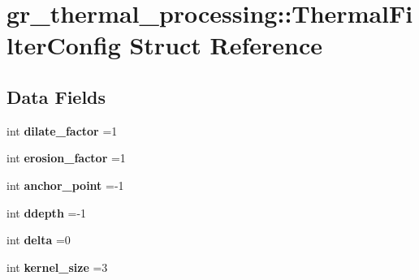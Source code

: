 \hypertarget{structgr__thermal__processing_1_1ThermalFilterConfig}{}\section{gr\+\_\+thermal\+\_\+processing\+:\+:Thermal\+Filter\+Config Struct Reference}
\label{structgr__thermal__processing_1_1ThermalFilterConfig}
\subsection*{Data Fields}
\begin{DoxyCompactItemize}
\item 
\mbox{\label{structgr__thermal__processing_1_1ThermalFilterConfig_acef89b6387318210f3413eb8b50fd862}} 
int {\bfseries dilate\+\_\+factor} =1
\item 
\mbox{\label{structgr__thermal__processing_1_1ThermalFilterConfig_aace1b2e21fad28bdfd6c4472dbae07de}} 
int {\bfseries erosion\+\_\+factor} =1
\item 
\mbox{\label{structgr__thermal__processing_1_1ThermalFilterConfig_af72c8201ea1b5498e6774e18b26acfd8}} 
int {\bfseries anchor\+\_\+point} =-\/1
\item 
\mbox{\label{structgr__thermal__processing_1_1ThermalFilterConfig_af84a31f8feba945eee13d9fc32813f65}} 
int {\bfseries ddepth} =-\/1
\item 
\mbox{\label{structgr__thermal__processing_1_1ThermalFilterConfig_a50bfc232e476c12cce1dff2c58d09088}} 
int {\bfseries delta} =0
\item 
\mbox{\label{structgr__thermal__processing_1_1ThermalFilterConfig_a86e89a77df3d1de431d04f1780dec743}} 
int {\bfseries kernel\+\_\+size} =3
\item 
\mbox{\label{structgr__thermal__processing_1_1ThermalFilterConfig_a55671cc53cf046e51413237a05b58523}} 

\end{DoxyCompactItemize}
